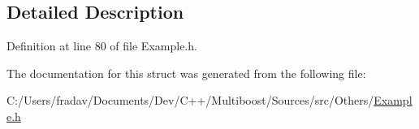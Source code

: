\subsection{Detailed Description}


Definition at line 80 of file Example.\-h.



The documentation for this struct was generated from the following file\-:\begin{DoxyCompactItemize}
\item 
C\-:/\-Users/fradav/\-Documents/\-Dev/\-C++/\-Multiboost/\-Sources/src/\-Others/\hyperlink{Example_8h}{Example.\-h}\end{DoxyCompactItemize}
